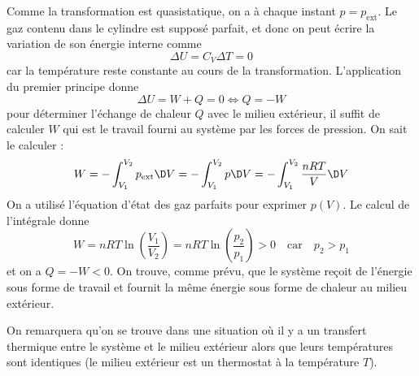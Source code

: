 \documentclass{cours}
\begin{document}
\begin{center}
\end{center}
Comme la transformation est quasistatique, on a à chaque instant $p=p_\text{ext}$. Le gaz contenu dans le cylindre est supposé parfait, et donc on peut écrire la variation de son énergie interne comme 
\begin{equation}
  \Delta U = C_V \Delta T = 0
\end{equation}  
car la température reste constante au cours de la transformation. L'application du premier principe donne 
\begin{equation}
  \Delta U = W + Q = 0 \Leftrightarrow Q = -W
\end{equation}
pour déterminer l'échange de chaleur $Q$ avec le milieu extérieur, il suffit de calculer $W$ qui est le travail fourni au système par les forces de pression. On sait le calculer :
\begin{equation}
  W = -\int_{V_1}^{V_2} p_\text{ext} \D V = -\int_{V_1}^{V_2} p \D V = -\int_{V_1}^{V_2}\frac{nRT}{V}\D V
\end{equation}
On a utilisé l'équation d'état des gaz parfaits pour exprimer $p(V)$. Le calcul de l'intégrale donne 
\begin{equation}
  W = nRT\ln\left(\frac{V_1}{V_2}\right) = nRT \ln\left( \frac{p_2}{p_1} \right) > 0 \quad \text{car} \quad p_2>p_1
\end{equation}
et on a $Q = -W < 0$. On trouve, comme prévu, que le système reçoit de l'énergie sous forme de travail et fournit la même énergie sous forme de chaleur au milieu extérieur. 

On remarquera qu'on se trouve dans une situation où il y a un transfert thermique entre le système et le milieu extérieur alors que leurs températures sont identiques (le milieu extérieur est un thermostat à la température $T$).
\end{document}
